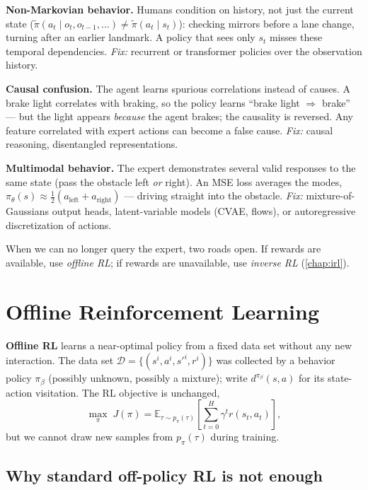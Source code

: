 \documentclass[11pt, oneside]{book}
\newcommand{\E}{\mathbb{E}}              %
\newcommand{\dataset}{\mathcal{D}}       %
\begin{document}
\begin{notebox}[title={Three classic imitation traps}]
\textbf{Non-Markovian behavior.} Humans condition on history, not just the current state
($\tilde\pi(a_t \mid o_t, o_{t-1}, \dots) \neq \tilde\pi(a_t \mid s_t)$): checking mirrors
before a lane change, turning after an earlier landmark. A policy that sees only $s_t$
misses these temporal dependencies. \emph{Fix:} recurrent or transformer policies over
the observation history.

\textbf{Causal confusion.} The agent learns spurious correlations instead of causes.
A brake light correlates with braking, so the policy learns ``brake light $\Rightarrow$
brake'' --- but the light appears \emph{because} the agent brakes; the causality is
reversed. Any feature correlated with expert actions can become a false cause.
\emph{Fix:} causal reasoning, disentangled representations.

\textbf{Multimodal behavior.} The expert demonstrates several valid responses to the
same state (pass the obstacle left \emph{or} right). An MSE loss averages the modes,
$\pi_\theta(s) \approx \tfrac{1}{2}(a_{\text{left}} + a_{\text{right}})$ ---
driving straight into the obstacle. \emph{Fix:} mixture-of-Gaussians output heads,
latent-variable models (CVAE, flows), or autoregressive discretization of actions.
\end{notebox}

When we can no longer query the expert, two roads open. If rewards are available, use
\emph{offline RL}; if rewards are unavailable, use \emph{inverse RL}
(\cref{chap:irl}).

\section{Offline Reinforcement Learning}

\textbf{Offline RL} learns a near-optimal policy from a fixed data set without any new
interaction. The data set $\dataset = \{(s^i, a^i, s'^i, r^i)\}$ was collected by a
behavior policy $\pi_\beta$ (possibly unknown, possibly a mixture); write $d^{\pi_\beta}(s,a)$
for its state-action visitation. The RL objective is unchanged,
\[
  \max_\pi\; J(\pi) = \E_{\tau \sim p_\pi(\tau)}\!\left[\sum_{t=0}^{H} \gamma^t r(s_t, a_t)\right],
\]
but we cannot draw new samples from $p_\pi(\tau)$ during training.

\subsection{Why standard off-policy RL is not enough}
\end{document}
